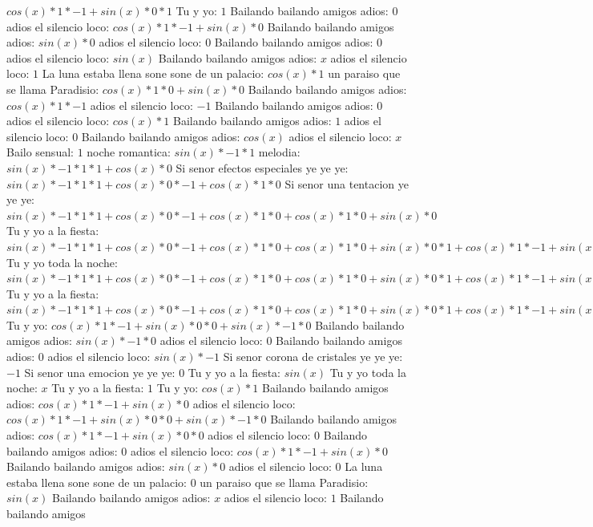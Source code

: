 \documentclass{article}
\begin{document}
${cos(x)*1*-1+sin(x)*0}*1$ Tu y yo: $1$ Bailando bailando amigos adios: $0$  \newline adios el silencio loco: $cos(x)*1*-1+sin(x)*0$  \newline Bailando bailando amigos adios: $sin(x)*0$ adios el silencio loco: $0$ Bailando bailando amigos adios: $0$  \newline adios el silencio loco: $sin(x)$  \newline Bailando bailando amigos adios: $x$ adios el silencio loco: $1$  \newline La luna estaba llena sone sone de un palacio: $cos(x)*1$ un paraiso que se llama Paradisio: $cos(x)*1*0+sin(x)*0$ Bailando bailando amigos adios: $cos(x)*1*-1$ adios el silencio loco: $-1$ Bailando bailando amigos adios: $0$  \newline adios el silencio loco: $cos(x)*1$ Bailando bailando amigos adios: $1$ adios el silencio loco: $0$  \newline Bailando bailando amigos adios: $cos(x)$  \newline adios el silencio loco: $x$ Bailo sensual: $1$  \newline noche romantica: $sin(x)*-1*1$ melodia: $sin(x)*-1*1*1+cos(x)*0$ Si senor efectos especiales ye ye ye: ${sin(x)*-1*1*1+cos(x)*0}*-1+cos(x)*1*0$ Si senor una tentacion ye ye ye: ${sin(x)*-1*1*1+cos(x)*0}*-1+cos(x)*1*0+cos(x)*1*0+sin(x)*0$ Tu y yo a la fiesta: ${{sin(x)*-1*1*1+cos(x)*0}*-1+cos(x)*1*0+cos(x)*1*0+sin(x)*0}*1+{cos(x)*1*-1+sin(x)*0}*0$ Tu y yo toda la noche: ${{sin(x)*-1*1*1+cos(x)*0}*-1+cos(x)*1*0+cos(x)*1*0+sin(x)*0}*1+{cos(x)*1*-1+sin(x)*0}*0+{cos(x)*1*-1+sin(x)*0}*0+sin(x)*-1*0$ Tu y yo a la fiesta: ${{sin(x)*-1*1*1+cos(x)*0}*-1+cos(x)*1*0+cos(x)*1*0+sin(x)*0}*1+{cos(x)*1*-1+sin(x)*0}*0+{cos(x)*1*-1+sin(x)*0}*0+sin(x)*-1*0$  \newline Tu y yo: ${cos(x)*1*-1+sin(x)*0}*0+sin(x)*-1*0$  \newline Bailando bailando amigos adios: $sin(x)*-1*0$ adios el silencio loco: $0$ Bailando bailando amigos adios: $0$  \newline adios el silencio loco: $sin(x)*-1$ Si senor corona de cristales ye ye ye: $-1$ Si senor una emocion ye ye ye: $0$  \newline Tu y yo a la fiesta: $sin(x)$  \newline Tu y yo toda la noche: $x$ Tu y yo a la fiesta: $1$  \newline Tu y yo: $cos(x)*1$ Bailando bailando amigos adios: $cos(x)*1*-1+sin(x)*0$ adios el silencio loco: ${cos(x)*1*-1+sin(x)*0}*0+sin(x)*-1*0$ Bailando bailando amigos adios: ${cos(x)*1*-1+sin(x)*0}*0$ adios el silencio loco: $0$ Bailando bailando amigos adios: $0$  \newline adios el silencio loco: $cos(x)*1*-1+sin(x)*0$  \newline Bailando bailando amigos adios: $sin(x)*0$ adios el silencio loco: $0$ La luna estaba llena sone sone de un palacio: $0$  \newline un paraiso que se llama Paradisio: $sin(x)$  \newline Bailando bailando amigos adios: $x$ adios el silencio loco: $1$  \newline Bailando bailando amigos 
\end{document}
